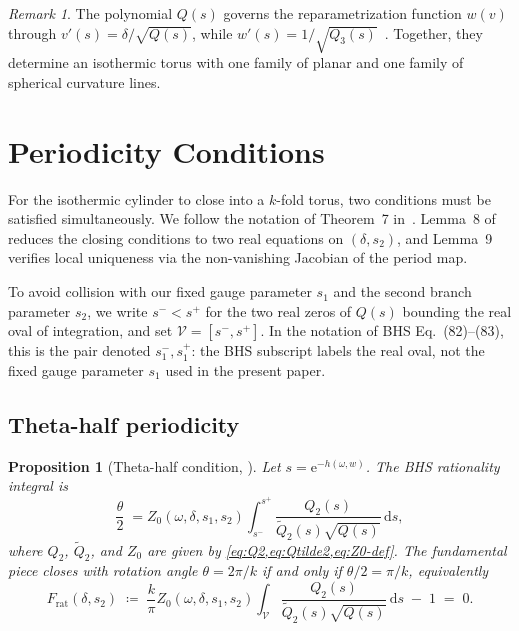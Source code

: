\documentclass[11pt,a4paper]{article}
\theoremstyle{plain}
\newtheorem{proposition}[theorem]{Proposition}
\theoremstyle{definition}
\theoremstyle{remark}
\newtheorem{remark}[theorem]{Remark}
\newcommand{\dd}{\mathrm{d}}
\newcommand{\ee}{\mathrm{e}}
\begin{document}
\begin{remark}
  The polynomial $Q(s)$ governs the reparametrization function
  $w(v)$ through $v'(s) = \delta/\sqrt{Q(s)}$, while
  $w'(s) = 1/\sqrt{Q_3(s)}$~\cite[Corollary~6]{BHS-comp}.
  Together, they determine an isothermic torus with one family of
  planar and one family of spherical curvature lines.
\end{remark}


\section{Periodicity Conditions}\label{sec:periodicity}

For the isothermic cylinder to close into a $k$-fold torus, two
conditions must be satisfied simultaneously.  We follow the notation of
Theorem~7 in~\cite{BHS25}.  Lemma~8 of~\cite{BHS25} reduces the
closing conditions to two real equations on $(\delta, s_2)$, and
Lemma~9 verifies local uniqueness via the non-vanishing Jacobian of the
period map.

To avoid collision with our fixed gauge parameter $s_1$ and the second
branch parameter $s_2$, we write $s^- < s^+$ for the two real zeros of
$Q(s)$ bounding the real oval of integration, and set
$\mathcal V = [s^-, s^+]$.  In the notation of BHS Eq.~(82)--(83),
this is the pair denoted $s_1^-, s_1^+$: the BHS subscript labels the
real oval, not the fixed gauge parameter $s_1$ used in the present
paper.

\subsection{Theta-half periodicity}\label{sec:theta-half}

\begin{proposition}[Theta-half condition,
  {\cite[Eq.~82]{BHS25}}]
\label{prop:theta-half}
Let $s = \ee^{-h(\omega,w)}$.  The BHS rationality integral is
\begin{equation}
  \frac{\theta}{2}
  \;=
  Z_0(\omega,\delta,s_1,s_2)
  \int_{s^-}^{s^+}
    \frac{Q_2(s)}{\widetilde Q_2(s)\sqrt{Q(s)}}\,\dd s,
  \label{eq:theta-half-bhs}
\end{equation}
where $Q_2$, $\widetilde Q_2$, and $Z_0$ are given by
\cref{eq:Q2,eq:Qtilde2,eq:Z0-def}.  The fundamental piece closes with
rotation angle $\theta = 2\pi/k$ if and only if $\theta/2 = \pi/k$,
equivalently
\begin{equation}
  F_{\mathrm{rat}}(\delta,s_2)
  \;\coloneqq\;
  \frac{k}{\pi}
  Z_0(\omega,\delta,s_1,s_2)
  \int_{\mathcal V}
    \frac{Q_2(s)}{\widetilde Q_2(s)\sqrt{Q(s)}}\,\dd s
  \;-\; 1
  \;=\; 0.
  \label{eq:F-rat}
\end{equation}
\end{proposition}
\end{document}
